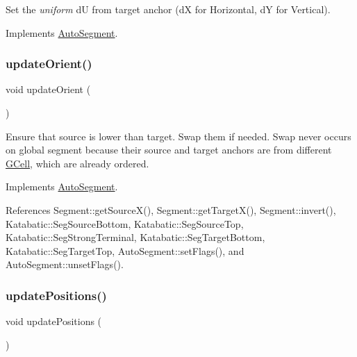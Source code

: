 Set the {\itshape uniform} {\ttfamily dU} from target anchor (dX for Horizontal, dY for Vertical). 

Implements \mbox{\hyperlink{classKatabatic_1_1AutoSegment_a246756d4c8b3e094a0a9d6de3c2109ff}{Auto\+Segment}}.

\mbox{\label{classKatabatic_1_1AutoHorizontal_a59058f4593049c583c5b3698ff81b299}} 
\subsubsection{\texorpdfstring{update\+Orient()}{updateOrient()}}
{\footnotesize\ttfamily void update\+Orient (\begin{DoxyParamCaption}{ }\end{DoxyParamCaption})\hspace{0.3cm}{\ttfamily [virtual]}}

Ensure that source is lower than target. Swap them if needed. Swap never occurs on global segment because their source and target anchors are from different \mbox{\hyperlink{classKatabatic_1_1GCell}{G\+Cell}}, which are already ordered. 

Implements \mbox{\hyperlink{classKatabatic_1_1AutoSegment_a102e0f4bbb0386e41be214d15a9e4549}{Auto\+Segment}}.



References Segment\+::get\+Source\+X(), Segment\+::get\+Target\+X(), Segment\+::invert(), Katabatic\+::\+Seg\+Source\+Bottom, Katabatic\+::\+Seg\+Source\+Top, Katabatic\+::\+Seg\+Strong\+Terminal, Katabatic\+::\+Seg\+Target\+Bottom, Katabatic\+::\+Seg\+Target\+Top, Auto\+Segment\+::set\+Flags(), and Auto\+Segment\+::unset\+Flags().

\mbox{\label{classKatabatic_1_1AutoHorizontal_a9662a77c2ed8553d6a0312c5292060ad}} 
\subsubsection{\texorpdfstring{update\+Positions()}{updatePositions()}}
{\footnotesize\ttfamily void update\+Positions (\begin{DoxyParamCaption}{ }\end{DoxyParamCaption})\hspace{0.3cm}{\ttfamily [virtual]}}

